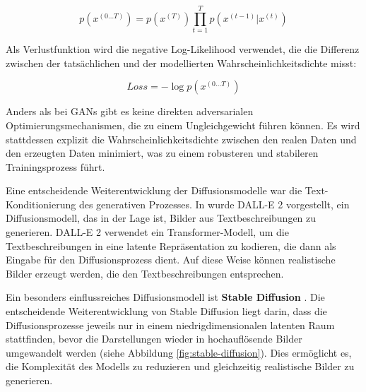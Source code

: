 \begin{equation}
	p \left( x^{(0 \dots T)} \right) = p \left(x^{(T)}\right)\prod_{t=1}^T p \left(x^{(t-1)}|x^{(t)}\right)
	\label{eq:reverse-diffusion}
\end{equation}

Als Verlustfunktion wird die negative Log-Likelihood verwendet, die die Differenz zwischen der tatsächlichen und der modellierten Wahrscheinlichkeitsdichte misst:

\begin{equation}
	Loss = -\log p \left( x^{(0 \dots T)} \right)
	\label{eq:loss-diffusion}
\end{equation}

Anders als bei GANs gibt es keine direkten adversarialen Optimierungsmechanismen, die zu einem Ungleichgewicht führen können. Es wird stattdessen explizit die Wahrscheinlichkeitsdichte zwischen den realen Daten und den erzeugten Daten minimiert, was zu einem robusteren und stabileren Trainingsprozess führt.

Eine entscheidende Weiterentwicklung der Diffusionsmodelle war die Text-Konditionierung des generativen Prozesses. In \parencite{Ramesh2022dalle2} wurde DALL-E 2 vorgestellt, ein Diffusionsmodell, das in der Lage ist, Bilder aus Textbeschreibungen zu generieren. DALL-E 2 verwendet ein Transformer-Modell, um die Textbeschreibungen in eine latente Repräsentation zu kodieren, die dann als Eingabe für den Diffusionsprozess dient. Auf diese Weise können realistische Bilder erzeugt werden, die den Textbeschreibungen entsprechen. %

Ein besonders einflussreiches Diffusionsmodell ist \textbf{Stable Diffusion} \parencite{Rombach2022stablediffusion}. Die entscheidende Weiterentwicklung von Stable Diffusion liegt darin, dass die Diffusionsprozesse jeweils nur in einem niedrigdimensionalen latenten Raum stattfinden, bevor die Darstellungen wieder in hochauflösende Bilder umgewandelt werden (siehe Abbildung \ref{fig:stable-diffusion}). Dies ermöglicht es, die Komplexität des Modells zu reduzieren und gleichzeitig realistische Bilder zu generieren.

